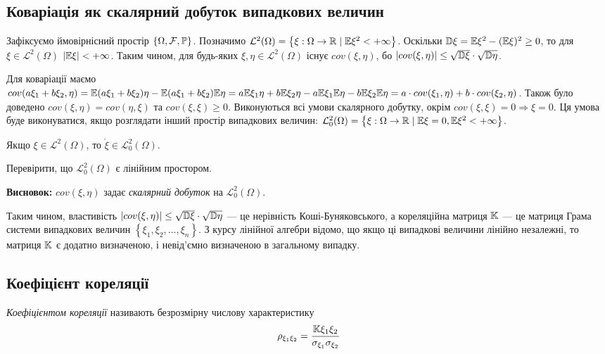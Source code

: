 \subsection{Коваріація як скалярний добуток випадкових величин}
Зафіксуємо ймовірнісний простір $\left\{\Omega, \mathcal{F}, \P\right\}$.
Позначимо $\mathcal{L}^2(\Omega) = \left\{\xi : \Omega \rightarrow \mathbb{R} \;|\; \E\xi^2 < +\infty\right\}$.
Оскільки $\D\xi = \E\xi^2 - (\E\xi)^2 \geq 0$, то для $\xi \in \mathcal{L}^2(\Omega)$ $|\E\xi| < +\infty$.
Таким чином, для будь-яких $\xi, \eta \in \mathcal{L}^2(\Omega)$ 
існує ${cov}(\xi,\eta)$, бо $|{cov}(\xi,\eta)| \leq \sqrt{\D\xi} \cdot \sqrt{\D\eta}$.

Для коваріації маємо 
${cov}(a\xi_1 + b\xi_2,\eta) = \E(a\xi_1+b\xi_2)\eta - \E(a\xi_1 + b\xi_2)\E\eta = 
a \E\xi_1\eta + b \E\xi_2\eta - a \E\xi_1 \E\eta - b \E\xi_2 \E\eta = a\cdot{cov}(\xi_1,\eta) + b\cdot{cov}(\xi_2,\eta)$.
Також було доведено ${cov}(\xi, \eta) = {cov}(\eta, \xi)$ та ${cov}(\xi, \xi) \geq 0$.
Виконуються всі умови скалярного добутку, окрім ${cov}(\xi, \xi) = 0 \Rightarrow \xi = 0$.
Ця умова буде виконуватися, якщо розглядати інший простір випадкових величин:
$\mathcal{L}_0^2(\Omega) = \left\{\xi : \Omega \rightarrow \mathbb{R} \;|\; \E\xi = 0, \E\xi^2 < +\infty\right\}$.
\begin{remark}
    Якщо $\xi \in \mathcal{L}^2(\Omega)$, то $\mathring{\xi} \in \mathcal{L}_0^2(\Omega)$.
\end{remark}
\begin{exercise}
    Перевірити, що $\mathcal{L}_0^2(\Omega)$ є лінійним простором.
\end{exercise}

\noindent \textbf{Висновок:} ${cov}(\xi, \eta)$ задає \emph{скалярний добуток} на $\mathcal{L}_0^2(\Omega)$.

Таким чином, властивість $|{cov}(\xi,\eta)| \leq \sqrt{\D\xi} \cdot \sqrt{\D\eta}$ ---
це нерівність Коші-Буняковського, а кореляційна матриця $\K$ --- це матриця Грама системи
випадкових величин $\left\{\xi_1, \xi_2, ..., \xi_n\right\}$.
З курсу лінійної алгебри відомо, що якщо ці випадкові величини лінійно незалежні, то матриця $\K$ є додатно визначеною, 
і невід'ємно визначеною в загальному випадку.

\subsection{Коефіцієнт кореляції}
\begin{definition}
    \emph{Коефіцієнтом кореляції} називають безрозмірну числову характеристику
    \begin{equation*}
        \rho_{\xi_1\xi_2} = \frac{\K\xi_1\xi_2}{\sigma_{\xi_1}\sigma_{\xi_2}}
    \end{equation*}
\end{definition}

